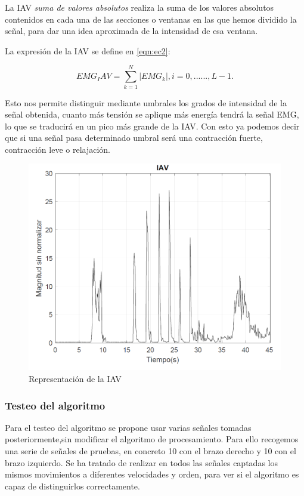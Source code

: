 La IAV \textit{suma de valores absolutos} realiza la suma de los valores absolutos contenidos en cada una de las secciones o ventanas en las que hemos dividido la señal, para dar una idea aproximada de la intensidad de esa ventana. \newline


 La expresión de la IAV se define en \ref{eqn:ec2}:

\begin{equation}
EMG_IAV=\sum_{k=1}^{N}|EMG_{k}|, i=0,......,L-1.
\label{eqn:ec2}
\end{equation}

Esto nos permite distinguir mediante umbrales los grados de intensidad de la señal obtenida, cuanto más tensión se aplique más energía tendrá la señal EMG, lo que se traducirá en un pico más grande de la IAV.
Con esto ya podemos decir que si una señal pasa determinado umbral será una contracción fuerte, contracción leve o relajación.

\begin{figure}[H]
	\center
	\includegraphics[scale=0.5]{imagenes/Disenodelsistema/graf5.png}
	\caption{Representación de la IAV}
	\label{fig:graf5}
\end{figure}

\subsubsection{Testeo del algoritmo}

Para el testeo del algoritmo se propone usar varias señales tomadas posteriormente,sin modificar el algoritmo de procesamiento. Para ello recogemos una serie de señales de pruebas, en concreto 10 con el brazo derecho y 10 con el brazo izquierdo. Se ha tratado de realizar en todos las señales captadas los mismos movimientos a diferentes velocidades y orden, para ver si el algoritmo es capaz de distinguirlos correctamente.  \newline

